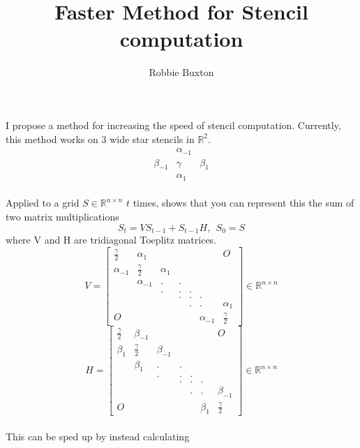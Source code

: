 \documentclass{article}
\begin{document}
\title{Faster Method for Stencil computation}
\author{Robbie Buxton}
\maketitle
I propose a method for increasing the speed of stencil computation. 
Currently, this method works on 3 wide star stencils in $\mathbb{R}^2$.
\newcommand{\stencilTop}{\alpha_{-1}}
\newcommand{\stencilLeft}{\beta_{-1}}
\newcommand{\stencilMiddle}{\gamma}
\newcommand{\stencilRight}{\beta_{1}}
\newcommand{\stencilBottom}{\alpha_{1}}
\[\begin{matrix} 
	& \stencilTop  & \\
	\stencilLeft  & \stencilMiddle  & \stencilRight  \\
	& \stencilBottom & 
\end{matrix}\] \\
\newcommand{\verticalBands}{V}
\newcommand{\horizontalBands}{H}
\newcommand{\sourceGrid}{S}
Applied to a grid $\sourceGrid \in \mathbb{R}^{n \times n}$ $t$ times,
\cite{10.1145/3524059.3532392} shows that you can represent this the sum of two matrix multiplications
\[ \sourceGrid_t = \verticalBands \sourceGrid_{t-1} + \sourceGrid_{t-1} \horizontalBands, \> \> S_0 = S\]
where V and H are tridiagonal Toeplitz matrices. 
\[ \verticalBands = 
\begin{bmatrix}
	\frac{\stencilMiddle}{2} & \stencilBottom & & & & & O \\ 
	\stencilTop & \frac{\stencilMiddle}{2} & \stencilBottom & & & & \\
	& \stencilTop & . & . & & & \\
	& &  . & . & . & &  \\
	& & & . & . & . & \\
	& & & & . & .& \stencilBottom \\
	O & & & & &  \stencilTop & \frac{\stencilMiddle}{2}
\end{bmatrix} \in \mathbb{R}^{n\times n} \]
\[\horizontalBands = 
\begin{bmatrix}
	\frac{\stencilMiddle}{2} & \stencilLeft & & & & & O \\ 
	\stencilRight & \frac{\stencilMiddle}{2} & \stencilLeft & & & & \\
	& \stencilRight & . & . & & & \\
	& &  . & . & . & &  \\
	& & & . & . & . & \\
	& & & & . & .& \stencilLeft \\
	O & & & & &  \stencilRight & \frac{\stencilMiddle}{2}
\end{bmatrix} \in \mathbb{R}^{n\times n}\] \\ 
This can be sped up by instead calculating
\newcommand{\innerSum}{C}
\newcommand{\verticalBasis}{{X_V}}
\newcommand{\verticalEigens}{{\Lambda_V}}
\newcommand{\horizontalBasis}{{X_H}}
\newcommand{\horizontalEigens}{{\Lambda_H}}
\newcommand{\transformedSourceGrid}{T}
\end{document}
